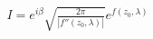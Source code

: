 \documentclass[preview]{standalone}
\begin{document}
\begin{align*}
I=e^{i\beta}\sqrt{\frac{2\pi}{|f''(z_0,\lambda)|}} e^{f(z_0,\lambda)}
\end{align*}
\end{document}
